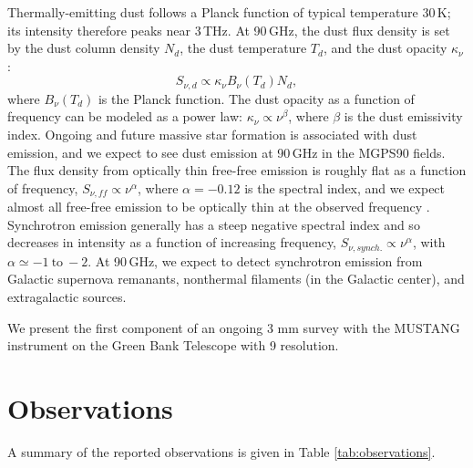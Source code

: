 \documentclass[twocolumn]{aastex62}
\begin{document}
Thermally-emitting dust follows a Planck function of typical temperature
30\,K; its intensity therefore peaks near 3\,THz.  At 90\,GHz, the dust flux
density is set by the dust column density $N_d$, the dust temperature $T_d$,
and the dust opacity $\kappa_\nu$:
\begin{equation}
    S_{\nu, d} \propto \kappa_\nu B_\nu(T_d) N_d,
    \label{eq:dust}
\end{equation}
where $B_\nu(T_d)$ is the Planck function.  The dust opacity as a function of
frequency can be modeled as a power law: $\kappa_\nu \propto \nu^{\beta}$,
where $\beta$ is the dust emissivity index.
Ongoing and future massive star formation is associated with dust emission, and
we expect to see dust emission at 90\,GHz in the MGPS90 fields.  
The flux density from optically thin free-free emission is roughly flat as a
function of frequency, $S_{\nu, ff} \propto \nu^{\alpha}$, where $\alpha=-0.12$
is the spectral index, and we expect almost
all free-free emission to be optically thin at the observed frequency
\citep{Wilson2009a,Condon2007a}. 
Synchrotron emission generally has a steep negative spectral index and so
decreases in intensity as a function of increasing frequency, $S_{\nu,
synch.}\propto \nu^{\alpha}$, with $\alpha\simeq -1 \mathrm{~to~} -2$.  At 90\,GHz, we expect
to detect synchrotron emission from Galactic supernova remanants, nonthermal
filaments (in the Galactic center), and extragalactic sources. 


We present the first component of an ongoing 3 mm survey with the MUSTANG instrument on
the Green Bank Telescope with 9 \arcsec resolution.


\section{Observations}

A summary of the reported observations is given in Table \ref{tab:observations}.
\end{document}
